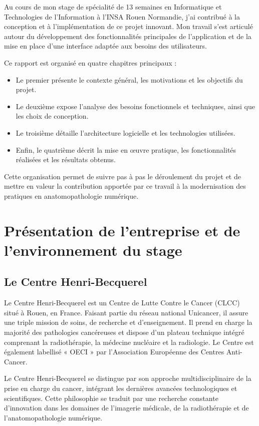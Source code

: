 \documentclass[12pt,a4paper]{report}
\let\oldchapter\chapter
\renewcommand{\chapter}{\clearpage\oldchapter}
\begin{document}
Au cours de mon stage de spécialité de 13 semaines en Informatique et Technologies de l'Information à l'INSA Rouen Normandie, j'ai contribué à la conception et à l'implémentation de ce projet innovant. Mon travail s'est articulé autour du développement des fonctionnalités principales de l'application et de la mise en place d'une interface adaptée aux besoins des utilisateurs.

Ce rapport est organisé en quatre chapitres principaux :
\begin{itemize}
\item Le premier présente le contexte général, les motivations et les objectifs du projet.
\item Le deuxième expose l'analyse des besoins fonctionnels et techniques, ainsi que les choix de conception.
\item Le troisième détaille l'architecture logicielle et les technologies utilisées.
\item Enfin, le quatrième décrit la mise en œuvre pratique, les fonctionnalités réalisées et les résultats obtenus.
\end{itemize}

Cette organisation permet de suivre pas à pas le déroulement du projet et de mettre en valeur la contribution apportée par ce travail à la modernisation des pratiques en anatomopathologie numérique.

\chapter{Présentation de l'entreprise et de l'environnement du stage}

\section{Le Centre Henri-Becquerel}

Le Centre Henri-Becquerel est un Centre de Lutte Contre le Cancer (CLCC) situé à Rouen, en France. Faisant partie du réseau national Unicancer, il assure une triple mission de soins, de recherche et d'enseignement. Il prend en charge la majorité des pathologies cancéreuses et dispose d'un plateau technique intégré comprenant la radiothérapie, la médecine nucléaire et la radiologie. Le Centre est également labellisé « OECI » par l'Association Européenne des Centres Anti-Cancer.

Le Centre Henri-Becquerel se distingue par son approche multidisciplinaire de la prise en charge du cancer, intégrant les dernières avancées technologiques et scientifiques. Cette philosophie se traduit par une recherche constante d'innovation dans les domaines de l'imagerie médicale, de la radiothérapie et de l'anatomopathologie numérique.
\end{document}
